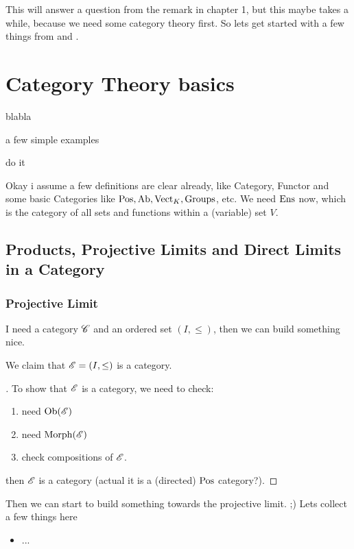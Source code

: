 This will answer a question from the remark in chapter 1, but this maybe takes a while, because we need some category theory first. So lets get started with a few things from \cite[p.~4]{Harder} and \cite{MacLane}.
\section{Category Theory basics}
\begin{definition}[category]
	blabla
\end{definition}
\begin{example}
	a few simple examples
\end{example}
\begin{definition}[functor]
	do it
\end{definition}
Okay i assume a few definitions are clear already, like Category, Functor and some basic Categories like $\operatorname{Pos}, \operatorname{Ab}, \operatorname{Vect}_K, \operatorname{Groups}$, etc.
We need $\operatorname{Ens}$ now, which is the category of all sets and functions within a (variable) set $V$.
\subsection{Products, Projective Limits and Direct Limits in a Category}
\subsubsection{Projective Limit}
I need a category $\mathscr C$ and an ordered set $(I,\le)$, then we can build something nice.
\begin{example}
	We claim that $\mathscr E =(I,\le)$ is a category.
\end{example}
\begin{proof}[]
	To show that $\mathscr E$ is a category, we need to check:
	\begin{enumerate}
		\item need $\operatorname{Ob}(\mathscr E)$
		\item need $\operatorname{Morph}(\mathscr E)$
		\item check compositions of $\mathscr E$.
	\end{enumerate}
	then $\mathscr E$ is a category (actual it is a (directed) $\operatorname{Pos}$ category?).
\end{proof}
Then we can start to build something towards the projective limit. ;) Lets collect a few things here
\begin{itemize}
	\item ...
\end{itemize}
